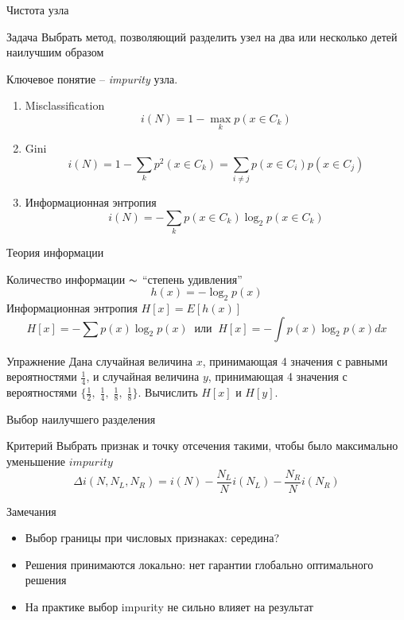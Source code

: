 \documentclass[10pt]{beamer}
\begin{document}
\begin{frame}{Чистота узла}

\begin{block}{Задача}
Выбрать метод, позволяющий разделить узел на два или несколько детей наилучшим образом
\end{block}

\vspace{1em}
Ключевое понятие -- {\it impurity} узла.
\begin{enumerate}
\item Misclassification
\[
i(N) = 1 - \max_k p(x \in C_k)
\]
\item Gini
\[
i(N) = 1 - \sum_k p^2(x \in C_k) = \sum_{i \neq j} p(x \in C_i) p(x \in C_j)
\]
\item Информационная энтропия
\[
i(N) =  -\sum_k p(x \in C_k) \log_2 p(x \in C_k)
\]
\end{enumerate}

\end{frame}


\begin{frame}{Теория информации}

Количество информации $\thicksim$ ``степень удивления''
\[
h(x) = -\log_2 p(x)
\]
Информационная энтропия $H[x] = E[h(x)]$
\[
H[x] = -\sum p(x) \log_2 p(x) \;\;\text{или}\;\; H[x] = - \int p(x) \log_2 p(x) dx
\]
\begin{exampleblock}{Упражнение}
Дана случайная величина $x$, принимающая 4 значения с равными вероятностями $\frac 1 4$, и случайная величина $y$, принимающая 4 значения с вероятностями $\{\frac 1 2, \; \frac 1 4, \; \frac 1 8, \; \frac 1 8\}$. Вычислить $H[x]$ и $H[y]$.
\end{exampleblock}

\end{frame}


\begin{frame}{Выбор наилучшего разделения}

\begin{block}{Критерий}
Выбрать признак и точку отсечения такими, чтобы было максимально уменьшение $impurity$
\[
\Delta i(N, N_L, N_R) = i(N) - \frac {N_L}{N} i(N_L) - \frac {N_R}{N} i(N_R)
\]
\end{block}

\vspace{1em}
Замечания
\begin{itemize}
\item Выбор границы при числовых признаках: середина?
\item Решения принимаются локально: нет гарантии глобально оптимального решения
\item На практике выбор impurity не сильно влияет на результат
\end{itemize}

\end{frame}
\end{document}
